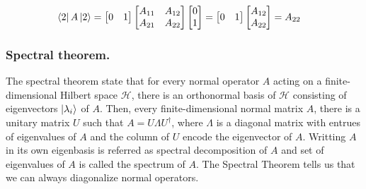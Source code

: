 \documentclass[../../../main.tex]{subfiles}
\begin{document}
\begin{align*}
	\bra{2}A \ket{2} & =
	\begin{bmatrix}
		0 & 1
	\end{bmatrix}
	\begin{bmatrix}
		A_{11} & A_{12} \\
		A_{21} & A_{22}
	\end{bmatrix}
	\begin{bmatrix}
		0 \\
		1
	\end{bmatrix}
	=
	\begin{bmatrix}
		0 & 1
	\end{bmatrix}
	\begin{bmatrix}
		A_{12} \\
		A_{22}
	\end{bmatrix}
	=A_{22}
\end{align*}


\subsubsection{Spectral theorem.}
The spectral theorem state that for every normal operator $A$ acting on a ﬁnite-dimensional Hilbert space $\mathcal{H}$, there is an orthonormal basis of $\mathcal{H}$ consisting of eigenvectors $\ket{\lambda_i}$ of $A$.
Then, every ﬁnite-dimensional normal matrix $A$, there is a unitary matrix $U$ such that $A=U\Lambda U ^\dagger$, where $\Lambda$ is a diagonal matrix with entrues of eigenvalues of $A$ and the column of $U$ encode the eigenvector of $A$.
Writting $A$ in its own eigenbasis is referred as spectral decomposition of $A$ and set of eigenvalues of $A$ is called the spectrum of $A$.
The Spectral Theorem tells us that we can always diagonalize normal operators.
\end{document}
